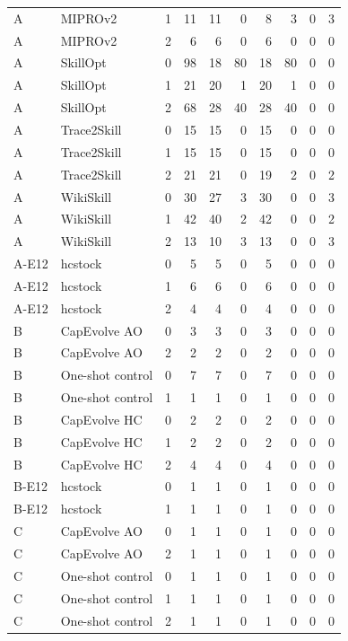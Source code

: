 \begin{table}[t]
\begin{tabular}{@{}llrrrrrrrr@{}}
A & MIPROv2 & 1 & 11 & 11 & 0 & 8 & 3 & 0 & 3 \\
A & MIPROv2 & 2 & 6 & 6 & 0 & 6 & 0 & 0 & 0 \\
A & SkillOpt & 0 & 98 & 18 & 80 & 18 & 80 & 0 & 0 \\
A & SkillOpt & 1 & 21 & 20 & 1 & 20 & 1 & 0 & 0 \\
A & SkillOpt & 2 & 68 & 28 & 40 & 28 & 40 & 0 & 0 \\
A & Trace2Skill & 0 & 15 & 15 & 0 & 15 & 0 & 0 & 0 \\
A & Trace2Skill & 1 & 15 & 15 & 0 & 15 & 0 & 0 & 0 \\
A & Trace2Skill & 2 & 21 & 21 & 0 & 19 & 2 & 0 & 2 \\
A & WikiSkill & 0 & 30 & 27 & 3 & 30 & 0 & 0 & 3 \\
A & WikiSkill & 1 & 42 & 40 & 2 & 42 & 0 & 0 & 2 \\
A & WikiSkill & 2 & 13 & 10 & 3 & 13 & 0 & 0 & 3 \\
\midrule
A-E12 & hcstock & 0 & 5 & 5 & 0 & 5 & 0 & 0 & 0 \\
A-E12 & hcstock & 1 & 6 & 6 & 0 & 6 & 0 & 0 & 0 \\
A-E12 & hcstock & 2 & 4 & 4 & 0 & 4 & 0 & 0 & 0 \\
\midrule
B & CapEvolve AO & 0 & 3 & 3 & 0 & 3 & 0 & 0 & 0 \\
B & CapEvolve AO & 2 & 2 & 2 & 0 & 2 & 0 & 0 & 0 \\
B & One-shot control & 0 & 7 & 7 & 0 & 7 & 0 & 0 & 0 \\
B & One-shot control & 1 & 1 & 1 & 0 & 1 & 0 & 0 & 0 \\
B & CapEvolve HC & 0 & 2 & 2 & 0 & 2 & 0 & 0 & 0 \\
B & CapEvolve HC & 1 & 2 & 2 & 0 & 2 & 0 & 0 & 0 \\
B & CapEvolve HC & 2 & 4 & 4 & 0 & 4 & 0 & 0 & 0 \\
\midrule
B-E12 & hcstock & 0 & 1 & 1 & 0 & 1 & 0 & 0 & 0 \\
B-E12 & hcstock & 1 & 1 & 1 & 0 & 1 & 0 & 0 & 0 \\
\midrule
C & CapEvolve AO & 0 & 1 & 1 & 0 & 1 & 0 & 0 & 0 \\
C & CapEvolve AO & 2 & 1 & 1 & 0 & 1 & 0 & 0 & 0 \\
C & One-shot control & 0 & 1 & 1 & 0 & 1 & 0 & 0 & 0 \\
C & One-shot control & 1 & 1 & 1 & 0 & 1 & 0 & 0 & 0 \\
C & One-shot control & 2 & 1 & 1 & 0 & 1 & 0 & 0 & 0 \\

\end{tabular}
\end{table}
